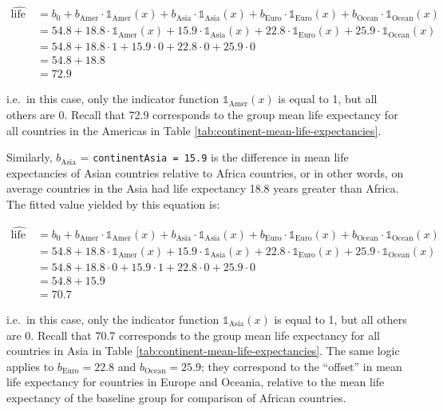 \documentclass[12pt,]{krantz}
\theoremstyle{definition}
\theoremstyle{definition}
\theoremstyle{definition}
\theoremstyle{remark}
\begin{document}
\begin{align}
\widehat{\text{life exp}} &= b_0 + b_{\text{Amer}}\cdot\mathbb{1}_{\mbox{Amer}}(x) + b_{\text{Asia}}\cdot\mathbb{1}_{\mbox{Asia}}(x)
+ b_{\text{Euro}}\cdot\mathbb{1}_{\mbox{Euro}}(x) + b_{\text{Ocean}}\cdot\mathbb{1}_{\mbox{Ocean}}(x)\\
&= 54.8 + 18.8\cdot\mathbb{1}_{\mbox{Amer}}(x) + 15.9\cdot\mathbb{1}_{\mbox{Asia}}(x)
+ 22.8\cdot\mathbb{1}_{\mbox{Euro}}(x) + 25.9\cdot\mathbb{1}_{\mbox{Ocean}}(x)\\
&= 54.8 + 18.8\cdot 1 + 15.9\cdot 0 + 22.8\cdot 0 + 25.9\cdot 0\\
&= 54.8 + 18.8\\
&= 72.9
\end{align}

i.e.~in this case, only the indicator function
\(\mathbb{1}_{\mbox{Amer}}(x)\) is equal to 1, but all others are 0.
Recall that 72.9 corresponds to the group mean life expectancy for all
countries in the Americas in Table
\ref{tab:continent-mean-life-expectancies}.

Similarly, \(b_{\text{Asia}}\) = \texttt{continentAsia\ =\ 15.9} is the
difference in mean life expectancies of Asian countries relative to
Africa countries, or in other words, on average countries in the Asia
had life expectancy 18.8 years greater than Africa. The fitted value
yielded by this equation is:

\begin{align}
\widehat{\text{life exp}} &= b_0 + b_{\text{Amer}}\cdot\mathbb{1}_{\mbox{Amer}}(x) + b_{\text{Asia}}\cdot\mathbb{1}_{\mbox{Asia}}(x)
+ b_{\text{Euro}}\cdot\mathbb{1}_{\mbox{Euro}}(x) + b_{\text{Ocean}}\cdot\mathbb{1}_{\mbox{Ocean}}(x)\\
&= 54.8 + 18.8\cdot\mathbb{1}_{\mbox{Amer}}(x) + 15.9\cdot\mathbb{1}_{\mbox{Asia}}(x)
+ 22.8\cdot\mathbb{1}_{\mbox{Euro}}(x) + 25.9\cdot\mathbb{1}_{\mbox{Ocean}}(x)\\
&= 54.8 + 18.8\cdot 0 + 15.9\cdot 1 + 22.8\cdot 0 + 25.9\cdot 0\\
&= 54.8 + 15.9\\
&= 70.7
\end{align}

i.e.~in this case, only the indicator function
\(\mathbb{1}_{\mbox{Asia}}(x)\) is equal to 1, but all others are 0.
Recall that 70.7 corresponds to the group mean life expectancy for all
countries in Asia in Table \ref{tab:continent-mean-life-expectancies}.
The same logic applies to \(b_{\text{Euro}} = 22.8\) and
\(b_{\text{Ocean}} = 25.9\); they correspond to the ``offset'' in mean
life expectancy for countries in Europe and Oceania, relative to the
mean life expectancy of the baseline group for comparison of African
countries.
\end{document}
